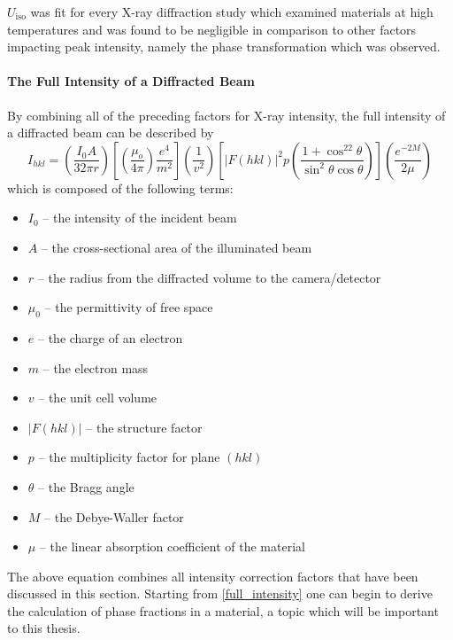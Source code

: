 $U_{\text{iso}}$ was fit for every X-ray diffraction study which examined materials at high temperatures and was found to be negligible in comparison to other factors impacting peak intensity, namely the phase transformation which was observed. 

\paragraph{The Full Intensity of a Diffracted Beam}
By combining all of the preceding factors for X-ray intensity, the full intensity of a diffracted beam can be described by
\begin{equation}
	I_{hkl} = \left(\frac{I_0A}{32\pi r}\right) 
	\left[ 
	\left(	\frac{\mu_o}{4\pi}	\right)
	\frac{e^4}{m^2}
	\right] 
	\left( 	\frac{1}{v^2}	\right) 
	\left[ 
	|F(hkl)|^2p
	\left( 	\frac{1+\cos^22\theta}{\sin^2\theta\cos\theta}	\right)
	\right] 
	\left(	 \frac{e^{-2M}}{2\mu}	\right)
	\label{full_intensity}
\end{equation}
which is composed of the following terms:
\begin{itemize}
	\item $I_0$ -- the intensity of the incident beam
	\item $A$ -- the cross-sectional area of the illuminated beam
	\item $r$ -- the radius from the diffracted volume to the camera/detector
	\item $\mu_0$ -- the permittivity of free space
	\item $e$ -- the charge of an electron
	\item $m$ -- the electron mass
	\item $v$ -- the unit cell volume
	\item $|F(hkl)|$ -- the structure factor
	\item $p$ -- the multiplicity factor for plane $(hkl)$
	\item $\theta$ -- the Bragg angle
	\item $M$ -- the Debye-Waller factor
	\item $\mu$ -- the linear absorption coefficient of the material
\end{itemize}
The above equation combines all intensity correction factors that have been discussed in this section. Starting from \ref{full_intensity} one can begin to derive the calculation of phase fractions in a material, a topic which will be important to this thesis.
